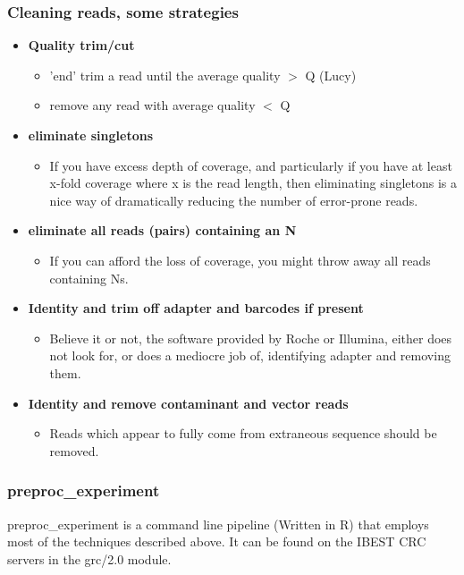 \documentclass[pdf]{beamer}
\begin{document}
\begin{frame}[allowframebreaks]
\frametitle{Cleaning reads, some strategies}
\begin{itemize}
\item \textbf{Quality trim/cut}
\begin{itemize} 
\item 'end' trim a read until the average quality $>$ Q (Lucy)
\item remove any read with average quality $<$ Q
\end{itemize}
\item \textbf{eliminate singletons}
\begin{itemize}
\item If you have excess depth of coverage, and particularly if you have at least x-fold coverage where x is the read length, then eliminating singletons is a nice way of dramatically reducing the number of error-prone reads.
\end{itemize}
\item \textbf{eliminate all reads (pairs) containing an N}
\begin{itemize}
\item If you can afford the loss of coverage, you might throw away all reads containing Ns.
\end{itemize}
\item \textbf{Identity and trim off adapter and barcodes if present}
\begin{itemize}
\item Believe it or not, the software provided by Roche or Illumina, either does not look for, or does a mediocre job of, identifying adapter and removing them.
\end{itemize}
\item \textbf{Identity and remove contaminant and vector reads}
\begin{itemize}
\item Reads which appear to fully come from extraneous sequence should be removed.
\end{itemize}

\end{itemize}
\end{frame}

\begin{frame}
\frametitle{preproc\_experiment}
preproc\_experiment is a command line pipeline (Written in R) that employs most of the techniques described above. It can be found on the IBEST CRC servers in the grc/2.0 module.
\end{frame}
\end{document}
